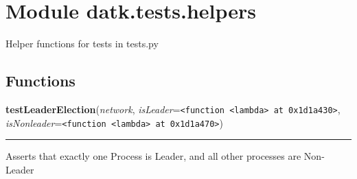 %
%
%


\section{Module datk.tests.helpers}

    \label{datk:tests:helpers}
Helper functions for tests in tests.py



  \subsection{Functions}

    \label{datk:tests:helpers:testLeaderElection}

    \vspace{0.5ex}

\hspace{.8\funcindent}\begin{boxedminipage}{\funcwidth}

    \raggedright \textbf{testLeaderElection}(\textit{network}, \textit{isLeader}={\tt {\textless}function {\textless}lambda{\textgreater} at 0x1d1a430{\textgreater}}, \textit{isNonleader}={\tt {\textless}function {\textless}lambda{\textgreater} at 0x1d1a470{\textgreater}})

    \vspace{-1.5ex}

    \rule{\textwidth}{0.5\fboxrule}
\setlength{\parskip}{2ex}
    Asserts that exactly one Process is Leader, and all other processes are
    Non-Leader

\setlength{\parskip}{1ex}
    \end{boxedminipage}

